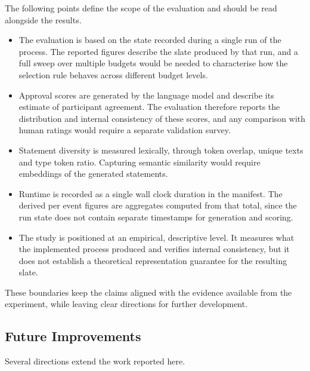 \documentclass[letterpaper,11pt]{article}
\theoremstyle{plain}
\theoremstyle{definition}
\begin{document}
The following points define the scope of the evaluation and should be read alongside the results. \smallskip

\begin{itemize}
\item The evaluation is based on the state recorded during a single run of the process. The reported figures describe the slate produced by that run, and a full sweep over multiple budgets would be needed to characterise how the selection rule behaves across different budget levels. \smallskip

\item Approval scores are generated by the language model and describe its estimate of participant agreement. The evaluation therefore reports the distribution and internal consistency of these scores, and any comparison with human ratings would require a separate validation survey. \smallskip

\item Statement diversity is measured lexically, through token overlap, unique texts and type token ratio. Capturing semantic similarity would require embeddings of the generated statements. \smallskip

\item Runtime is recorded as a single wall clock duration in the manifest. The derived per event figures are aggregates computed from that total, since the run state does not contain separate timestamps for generation and scoring. \smallskip

\item The study is positioned at an empirical, descriptive level. It measures what the implemented process produced and verifies internal consistency, but it does not establish a theoretical representation guarantee for the resulting slate.
\end{itemize}

These boundaries keep the claims aligned with the evidence available from the experiment, while leaving clear directions for further development.

\subsection{Future Improvements}

Several directions extend the work reported here. \smallskip
\end{document}
